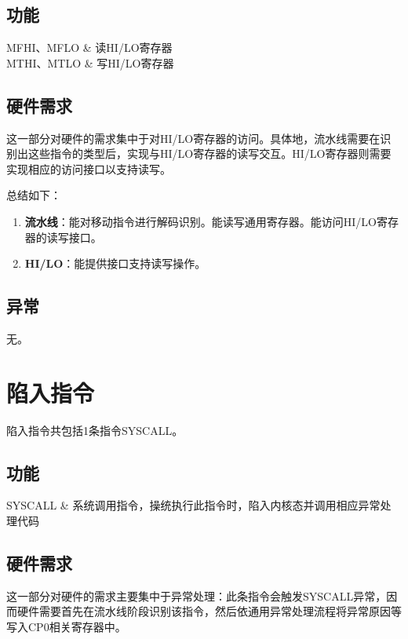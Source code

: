 \subsection{功能}

    MFHI、MFLO & 读HI/LO寄存器 \\
    MTHI、MTLO & 写HI/LO寄存器 \\
\tableend

\subsection{硬件需求}

这一部分对硬件的需求集中于对HI/LO寄存器的访问。具体地，流水线需要在识别出这些指令的类型后，实现与HI/LO寄存器的读写交互。HI/LO寄存器则需要实现相应的访问接口以支持读写。

总结如下：

\begin{enumerate}
    \item {\bf 流水线}：能对移动指令进行解码识别。能读写通用寄存器。能访问HI/LO寄存器的读写接口。
    \item {\bf HI/LO}：能提供接口支持读写操作。
\end{enumerate}

\subsection{异常}

无。

\section{陷入指令}

陷入指令共包括1条指令SYSCALL。

\subsection{功能}

    SYSCALL & 系统调用指令，操统执行此指令时，陷入内核态并调用相应异常处理代码 \\
\tableend

\subsection{硬件需求}

这一部分对硬件的需求主要集中于异常处理：此条指令会触发SYSCALL异常，因而硬件需要首先在流水线阶段识别该指令，然后依通用异常处理流程将异常原因等写入CP0相关寄存器中。

